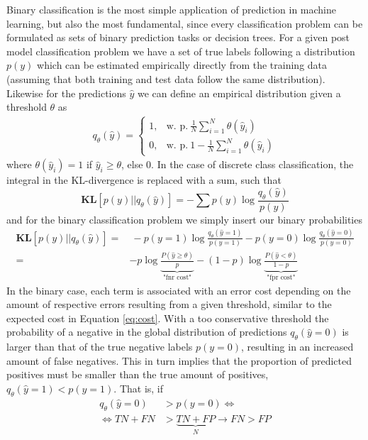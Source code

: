 \documentclass{article}
\begin{document}
Binary classification is the most simple application of prediction in machine learning, but also the most fundamental, since every classification problem can be formulated as sets of binary prediction tasks or decision trees. For a given post model classification problem we have a set of true labels following a distribution $p(y)$ which can be estimated empirically directly from the training data (assuming that both training and test data follow the same distribution). Likewise for the predictions $\hat{y}$ we can define an empirical distribution given a threshold $\theta$ as
\begin{align*}
    q_\theta(\hat{y}) = \begin{cases} 1, & \text{w. p.} \ \frac{1}{N}\sum_{i=1}^N \theta(\hat{y}_i) \\[0.2cm]
    0, &  \text{w. p.} \ 1 - \frac{1}{N}\sum_{i=1}^N \theta(\hat{y}_i) \end{cases}
\end{align*}
where $\theta(\hat{y}_i) = 1$ if $\hat{y}_i \geq \theta$, else 0.
In the case of discrete class classification, the integral in the KL-divergence is replaced with a sum, such that
\begin{equation}
\textbf{KL}[p(y) \vert\vert q_\theta(\hat{y})] = -\sum p(y) \log \frac{q_\theta(\hat{y})}{p(y)}
\end{equation}
and for the binary classification problem we simply insert our binary probabilities
\begin{align}
\textbf{KL}[p(y) \vert\vert q_\theta(\hat{y})] = & \ - p(y=1) \log \frac{q_\theta(\hat{y}=1)}{p(y=1)} - p(y=0) \log \frac{q_\theta(\hat{y}=0)}{p(y=0)} \\ = & \label{eq:tprfpr} -p \log \underbrace{\frac{P(\hat{y}\geq \theta)}{p}}_\text{"fnr cost"} - (1-p) \log \underbrace{\frac{P(\hat{y} < \theta)}{1-p}}_\text{"fpr cost"}
\end{align}
In the binary case, each term is associated with an error cost depending on the amount of respective errors resulting from a given threshold, similar to the expected cost in Equation \ref{eq:cost}. With a too conservative threshold the probability of a negative in the global distribution of predictions $q_\theta (\hat{y}=0)$ is larger than that of the true negative labels $p(y=0)$, resulting in an increased amount of false negatives. This in turn implies that the proportion of predicted positives must be smaller than the true amount of positives, $q_\theta(\hat{y} = 1) < p(y=1)$. That is, if
\begin{align*}
    q_\theta(\hat{y}=0) &> p(y=0) \iff \\
    \iff TN + FN &> \underbrace{TN+FP}_{N} \rightarrow FN>FP
\end{align*}
\end{document}
